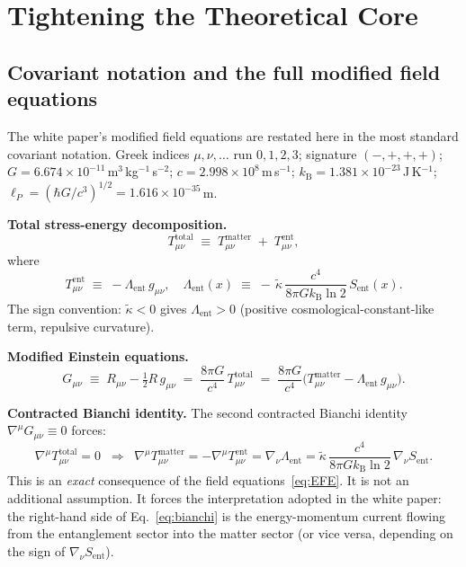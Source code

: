 \documentclass[12pt,letterpaper]{article}
\theoremstyle{plain}
\theoremstyle{definition}
\theoremstyle{remark}
\newcommand{\kB}{k_{\mathrm{B}}}
\newcommand{\lP}{\ell_{P}}
\newcommand{\kt}{\tilde{\kappa}}
\newcommand{\Sent}{S_{\mathrm{ent}}}
\begin{document}
\section{Tightening the Theoretical Core}
\label{sec:theory}

\subsection{Covariant notation and the full modified field equations}

The white paper's modified field equations are restated here in the most standard
covariant notation.  Greek indices $\mu,\nu,\ldots$ run $0,1,2,3$; signature $(-,+,+,+)$;
$G = 6.674\times10^{-11}$\,m$^3$\,kg$^{-1}$\,s$^{-2}$; $c = 2.998\times10^8$\,m\,s$^{-1}$;
$\kB = 1.381\times10^{-23}$\,J\,K$^{-1}$; $\lP = (\hbar G/c^3)^{1/2} = 1.616\times10^{-35}$\,m.

\textbf{Total stress-energy decomposition.}
\begin{equation}
  T^{\mathrm{total}}_{\mu\nu}
  \;\equiv\;
  T^{\mathrm{matter}}_{\mu\nu}
  \;+\;
  T^{\mathrm{ent}}_{\mu\nu},
  \label{eq:decomp}
\end{equation}
where
\begin{equation}
  T^{\mathrm{ent}}_{\mu\nu}
  \;\equiv\;
  -\Lambda_{\mathrm{ent}}\,g_{\mu\nu},
  \quad
  \Lambda_{\mathrm{ent}}(x)
  \;\equiv\;
  -\,\kt\,\frac{c^4}{8\pi G\kB\ln 2}\,\Sent(x).
  \label{eq:Tent}
\end{equation}
The sign convention: $\kt < 0$ gives $\Lambda_{\mathrm{ent}} > 0$ (positive cosmological-constant-like
term, repulsive curvature).

\textbf{Modified Einstein equations.}
\begin{equation}
  G_{\mu\nu}
  \;\equiv\;
  R_{\mu\nu} - \tfrac{1}{2}R\,g_{\mu\nu}
  \;=\;
  \frac{8\pi G}{c^4}\,T^{\mathrm{total}}_{\mu\nu}
  \;=\;
  \frac{8\pi G}{c^4}\bigl(T^{\mathrm{matter}}_{\mu\nu} - \Lambda_{\mathrm{ent}}\,g_{\mu\nu}\bigr).
  \label{eq:EFE}
\end{equation}

\textbf{Contracted Bianchi identity.}  The second contracted Bianchi identity
$\nabla^\mu G_{\mu\nu} \equiv 0$ forces:
\begin{equation}
  \nabla^\mu T^{\mathrm{total}}_{\mu\nu} = 0
  \;\;\Longrightarrow\;\;
  \nabla^\mu T^{\mathrm{matter}}_{\mu\nu}
  = -\nabla^\mu T^{\mathrm{ent}}_{\mu\nu}
  = \nabla_\nu\Lambda_{\mathrm{ent}}
  = \kt\,\frac{c^4}{8\pi G\kB\ln 2}\,\nabla_\nu\Sent.
  \label{eq:bianchi}
\end{equation}
This is an \emph{exact} consequence of the field equations~\eqref{eq:EFE}.  It is not an
additional assumption.  It forces the interpretation adopted in the white paper:
the right-hand side of Eq.~\eqref{eq:bianchi} is the energy-momentum current flowing
from the entanglement sector into the matter sector (or vice versa, depending on the sign
of $\nabla_\nu\Sent$).
\end{document}

